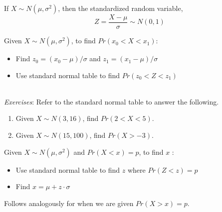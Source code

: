 \documentclass{./../../Latex/handout}
\begin{document}
\thispagestyle{plain}
\begin{center}
\end{center}	

If $X \sim N(\mu, \sigma^2)$, then the standardized random variable,
$$ Z = \frac{X-\mu}{\sigma} \sim N(0,1) $$

Given $X \sim N(\mu, \sigma^2)$, to find $Pr(x_0<X<x_1)$: \vspace{-1em}
\begin{itemize}
  \item Find $z_0 = (x_0-\mu)/\sigma$ and $z_1 = (x_1-\mu)/\sigma$
  \item Use standard normal table to find $Pr(z_0<Z<z_1)$ \\~\\
\end{itemize}

\textit{Exercises}: Refer to the standard normal table to answer the following.
\begin{enumerate}
  \item Given $X \sim N(3, 16)$, find $Pr(2<X<5)$. \vspace{4cm}
  \item Given $X \sim N(15, 100)$, find $Pr(X>-3)$. 
\end{enumerate}

\newpage
Given $X \sim N(\mu, \sigma^2)$ and $Pr(X<x)=p$, to find $x$ : \vspace{-1em}
\begin{itemize}
  \item Use standard normal table to find $z$ where $Pr(Z<z)=p$ 
  \item Find $x = \mu + z \cdot \sigma $  \vspace{-1em}
\end{itemize}
Follows analogously for when we are given $Pr(X>x)=p$. \\~\\ \vspace{-0.25cm}
\end{document}
